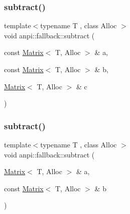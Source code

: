 \subsubsection{\texorpdfstring{subtract()}{subtract()}\hspace{0.1cm}{\footnotesize\ttfamily [1/2]}}
{\footnotesize\ttfamily template$<$typename T , class Alloc $>$ \\
void anpi\+::fallback\+::subtract (\begin{DoxyParamCaption}\item[{const \hyperlink{classanpi_1_1Matrix}{Matrix}$<$ T, Alloc $>$ \&}]{a,  }\item[{const \hyperlink{classanpi_1_1Matrix}{Matrix}$<$ T, Alloc $>$ \&}]{b,  }\item[{\hyperlink{classanpi_1_1Matrix}{Matrix}$<$ T, Alloc $>$ \&}]{c }\end{DoxyParamCaption})\hspace{0.3cm}{\ttfamily [inline]}}

\mbox{\label{namespaceanpi_1_1fallback_a33e33fc558cc7712504723cd2d9ac5b9}} 
\subsubsection{\texorpdfstring{subtract()}{subtract()}\hspace{0.1cm}{\footnotesize\ttfamily [2/2]}}
{\footnotesize\ttfamily template$<$typename T , class Alloc $>$ \\
void anpi\+::fallback\+::subtract (\begin{DoxyParamCaption}\item[{\hyperlink{classanpi_1_1Matrix}{Matrix}$<$ T, Alloc $>$ \&}]{a,  }\item[{const \hyperlink{classanpi_1_1Matrix}{Matrix}$<$ T, Alloc $>$ \&}]{b }\end{DoxyParamCaption})\hspace{0.3cm}{\ttfamily [inline]}}


